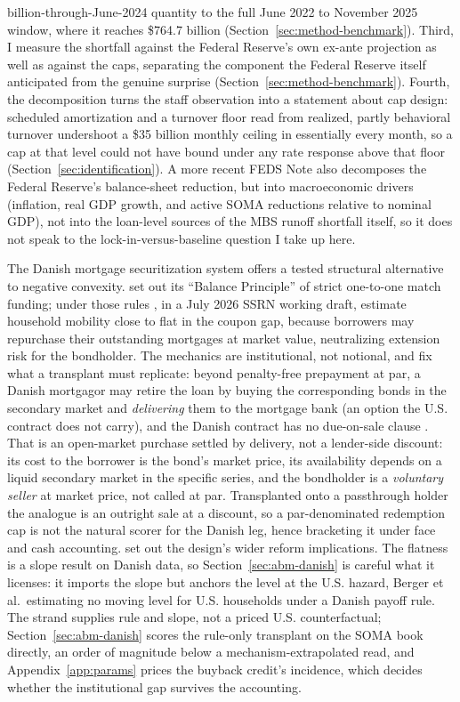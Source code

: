 \documentclass[12pt]{article}
\begin{document}
billion-through-June-2024 quantity to the full June 2022 to November 2025 window, where it reaches \$764.7 billion (Section~\ref{sec:method-benchmark}). Third, I measure the shortfall against the Federal Reserve's own ex-ante projection as well as against the caps, separating the component the Federal Reserve itself anticipated from the genuine surprise (Section~\ref{sec:method-benchmark}). Fourth, the decomposition turns the staff observation into a statement about cap design: scheduled amortization and a turnover floor read from realized, partly behavioral turnover undershoot a \$35 billion monthly ceiling in essentially every month, so a cap at that level could not have bound under any rate response above that floor (Section~\ref{sec:identification}). A more recent \citet{eyal2026} FEDS Note also decomposes the Federal Reserve's balance-sheet reduction, but into macroeconomic drivers (inflation, real GDP growth, and active SOMA reductions relative to nominal GDP), not into the loan-level sources of the MBS runoff shortfall itself, so it does not speak to the lock-in-versus-baseline question I take up here.

The Danish mortgage securitization system offers a tested structural alternative to negative convexity. \citet{berg2018} set out its ``Balance Principle'' of strict one-to-one match funding; under those rules \citet[\S3.3.2]{berger2026}, in a July 2026 SSRN working draft, estimate household mobility close to flat in the coupon gap, because borrowers may repurchase their outstanding mortgages at market value, neutralizing extension risk for the bondholder. The mechanics are institutional, not notional, and fix what a transplant must replicate: beyond penalty-free prepayment at par, a Danish mortgagor may retire the loan by buying the corresponding bonds in the secondary market and \emph{delivering} them to the mortgage bank (an option the U.S. contract does not carry), and the Danish contract has no due-on-sale clause \citep{frankel2004}. That is an open-market purchase settled by delivery, not a lender-side discount: its cost to the borrower is the bond's market price, its availability depends on a liquid secondary market in the specific series, and the bondholder is a \emph{voluntary seller} at market price, not called at par. Transplanted onto a passthrough holder the analogue is an outright sale at a discount, so a par-denominated redemption cap is not the natural scorer for the Danish leg, hence bracketing it under face and cash accounting. \citet{svenstrup2006} set out the design's wider reform implications. The flatness is a slope result on Danish data, so Section~\ref{sec:abm-danish} is careful what it licenses: it imports the slope but anchors the level at the U.S. hazard, Berger et al.\ estimating no moving level for U.S. households under a Danish payoff rule. The strand supplies rule and slope, not a priced U.S. counterfactual; Section~\ref{sec:abm-danish} scores the rule-only transplant on the SOMA book directly, an order of magnitude below a mechanism-extrapolated read, and Appendix~\ref{app:params} prices the buyback credit's incidence, which decides whether the institutional gap survives the accounting.
\end{document}

